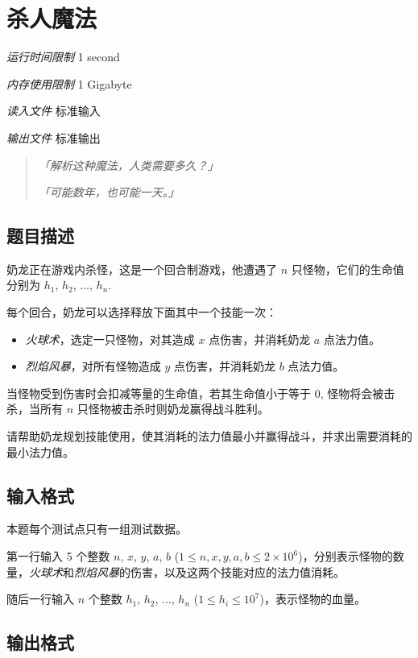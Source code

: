 \section[E. 杀人魔法]{ 杀人魔法}

\textit{运行时间限制}   1 second

\textit{内存使用限制} 1 Gigabyte

\textit{读入文件} \qquad 标准输入

\textit{输出文件} \qquad 标准输出

\begin{quote}
   \textit{「解析这种魔法，人类需要多久？」}

   \textit{「可能数年，也可能一天。」}
\end{quote}


\subsection{题目描述}

奶龙正在游戏内杀怪，这是一个回合制游戏，他遭遇了 $n$ 只怪物，它们的生命值分别为 $h_1$, $h_2$, $\ldots$, $h_n$.

每个回合，奶龙可以选择释放下面其中一个技能一次：
\begin{itemize}
   \item \textit{火球术}，选定一只怪物，对其造成 $x$ 点伤害，并消耗奶龙 $a$ 点法力值。
   \item \textit{烈焰风暴}，对所有怪物造成 $y$ 点伤害，并消耗奶龙 $b$ 点法力值。
\end{itemize}

当怪物受到伤害时会扣减等量的生命值，若其生命值小于等于 $0$, 怪物将会被击杀，当所有 $n$ 只怪物被击杀时则奶龙赢得战斗胜利。

请帮助奶龙规划技能使用，使其消耗的法力值最小并赢得战斗，并求出需要消耗的最小法力值。

\subsection{输入格式}

本题每个测试点只有一组测试数据。

第一行输入 5 个整数 $n$, $x$, $y$, $a$, $b$ ($1 \le n, x, y, a, b \le 2 \times 10^6$)，分别表示怪物的数量，\textit{火球术}和\textit{烈焰风暴}的伤害，以及这两个技能对应的法力值消耗。

随后一行输入 $n$ 个整数 $h_1$, $h_2$, $\ldots$, $h_n$ ($1 \le h_i \le 10^7$)，表示怪物的血量。

\subsection{输出格式}

